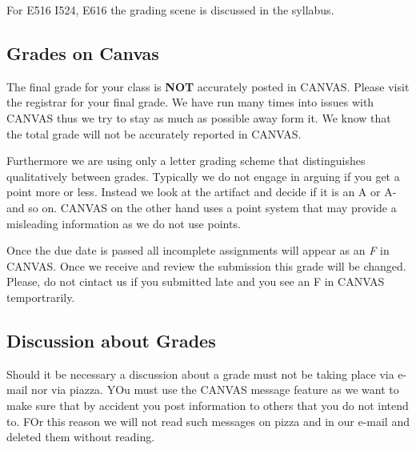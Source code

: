 For E516 I524, E616 the grading scene is discussed in the syllabus.


\subsection{Grades on Canvas}

The final grade for your class is {\bf NOT} accurately posted in
CANVAS. Please visit the registrar for your final grade.
We have run many times into issues with CANVAS thus we try to stay as
much as possible away form it. We know that the total grade will not
be accurately reported in CANVAS.

Furthermore we are using only a letter grading scheme that
distinguishes qualitatively between grades. Typically we do not engage
in arguing if you get a point more or less. Instead we look at the
artifact and decide if it is an A or A- and so on. CANVAS on the other
hand uses a point system that may provide a misleading information as
we do not use points.

Once the due date is passed all incomplete assignments will appear as
an {\em F} in CANVAS. Once we receive and review the submission this grade will
be changed. Please, do not cintact us if you submitted late and you
see an F in CANVAS temportrarily.

\subsection{Discussion about Grades}

Should it be necessary a discussion about a grade must not be taking
place via e-mail nor via piazza. YOu must use the CANVAS message
feature as we want to make sure that by accident you post information
to others that you do not intend to. FOr this reason we will not read
such messages on pizza and in our e-mail and deleted them without reading.
